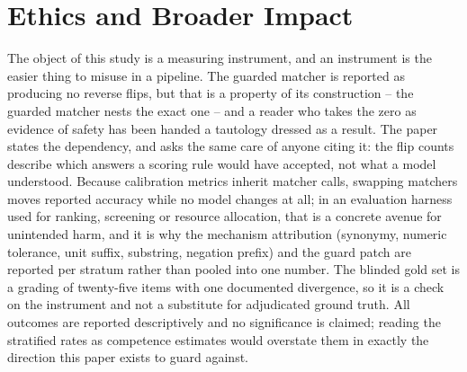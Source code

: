\documentclass[10pt]{article} %
\begin{document}
\section{Ethics and Broader Impact}

The object of this study is a measuring instrument, and an instrument is the easier thing to
misuse in a pipeline. The guarded matcher is reported as producing no reverse flips, but
that is a property of its construction -- the guarded matcher nests the exact one -- and a
reader who takes the zero as evidence of safety has been handed a tautology dressed as a
result. The paper states the dependency, and asks the same care of anyone citing it: the
flip counts describe which answers a scoring rule would have accepted, not what a model
understood. Because calibration metrics inherit matcher calls, swapping matchers moves
reported accuracy while no model changes at all; in an evaluation harness used for ranking,
screening or resource allocation, that is a concrete avenue for unintended harm, and it is
why the mechanism attribution (synonymy, numeric tolerance, unit suffix, substring,
negation prefix) and the guard patch are reported per stratum rather than pooled into one
number. The blinded gold set is a grading of twenty-five items with one documented
divergence, so it is a check on the instrument and not a substitute for adjudicated ground
truth. All outcomes are reported descriptively and no significance is claimed; reading the
stratified rates as competence estimates would overstate them in exactly the direction this
paper exists to guard against.





\appendix
\end{document}
